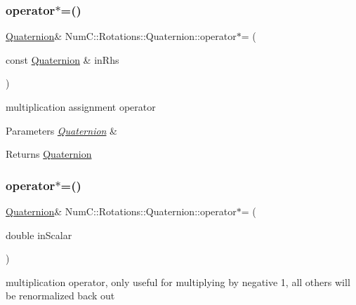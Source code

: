 \subsubsection{\texorpdfstring{operator$\ast$=()}{operator*=()}\hspace{0.1cm}{\footnotesize\ttfamily [1/2]}}
{\footnotesize\ttfamily \mbox{\hyperlink{class_num_c_1_1_rotations_1_1_quaternion}{Quaternion}}\& Num\+C\+::\+Rotations\+::\+Quaternion\+::operator$\ast$= (\begin{DoxyParamCaption}\item[{const \mbox{\hyperlink{class_num_c_1_1_rotations_1_1_quaternion}{Quaternion}} \&}]{in\+Rhs }\end{DoxyParamCaption})\hspace{0.3cm}{\ttfamily [inline]}}

multiplication assignment operator


\begin{DoxyParams}{Parameters}
{\em \mbox{\hyperlink{class_num_c_1_1_rotations_1_1_quaternion}{Quaternion}}} & \\
\hline
\end{DoxyParams}
\begin{DoxyReturn}{Returns}
\mbox{\hyperlink{class_num_c_1_1_rotations_1_1_quaternion}{Quaternion}} 
\end{DoxyReturn}
\mbox{\label{class_num_c_1_1_rotations_1_1_quaternion_af03ac55c3ec402ac2e8649756726781e}} 
\subsubsection{\texorpdfstring{operator$\ast$=()}{operator*=()}\hspace{0.1cm}{\footnotesize\ttfamily [2/2]}}
{\footnotesize\ttfamily \mbox{\hyperlink{class_num_c_1_1_rotations_1_1_quaternion}{Quaternion}}\& Num\+C\+::\+Rotations\+::\+Quaternion\+::operator$\ast$= (\begin{DoxyParamCaption}\item[{double}]{in\+Scalar }\end{DoxyParamCaption})\hspace{0.3cm}{\ttfamily [inline]}}

multiplication operator, only useful for multiplying by negative 1, all others will be renormalized back out


